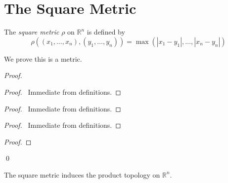 \section{The Square Metric}

\begin{df}
  The \emph{square metric} $\rho$ on $\mathbb{R}^n$ is defined by
  \[ \rho((x_1, \ldots, x_n), (y_1, \ldots, y_n)) = \max(|x_1 - y_1|, \ldots, |x_n - y_n|) \]

  We prove this is a metric.
\end{df}

\begin{proof}
  \pf
  \begin{proof}
    \pf\ Immediate from definitions.
  \end{proof}
  \begin{proof}
    \pf\ Immediate from definitions.
  \end{proof}
  \begin{proof}
    \pf\ Immediate from definitions.
  \end{proof}
  \begin{proof}
  \end{proof}
  \qed
\end{proof}

\begin{prop}
  \label{prop:metric:square}
  The square metric induces the product topology on $\mathbb{R}^n$.
\end{prop}

